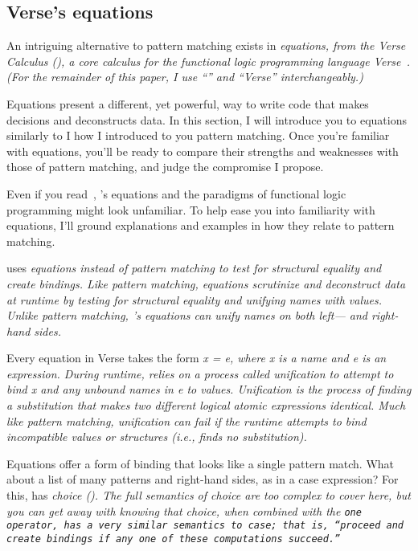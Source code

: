 \documentclass[manuscript,screen,review, 12pt, nonacm]{acmart}
\begin{document}
    
    \subsection{Verse's equations}
    \label{verseoverobservers}

    An intriguing alternative to pattern matching exists in \it{equations}, from
    the Verse Calculus (\VC), a core calculus for the functional logic
    programming language \it{Verse}~\citep{antoy2010functional,
    hanus2013functional, verse}. (For the remainder of this paper, I use “\VC”
    and “Verse” interchangeably.)

    Equations present a different, yet powerful, way to write code that makes
    decisions and deconstructs data. In this section, I will introduce you to
    equations similarly to I how I introduced to you pattern matching. Once
    you're familiar with equations, you'll be ready to compare their strengths
    and weaknesses with those of pattern matching, and judge the compromise I
    propose. 

    Even if you read~\citet{verse}, \VC's equations and the paradigms of
    functional logic programming might look unfamiliar. To help ease you into
    familiarity with equations, I'll ground explanations and examples in how
    they relate to pattern matching. 

    \VC uses \it{equations} instead of pattern matching to test for structural
    equality and create bindings. Like pattern matching, equations scrutinize
    and deconstruct data at runtime by testing for structural equality and
    unifying names with values. Unlike pattern matching, \VC's equations can
    unify names on both left--- \it{and} right-hand sides. 

    Every equation in Verse takes the form \it{x = e}, where \it{x} is a name
    and \it{e} is an expression. During runtime, \VC relies on a process called
    \it{unification} to attempt to bind \it{x} and any unbound names in \it{e}
    to values. Unification is the process of finding a substitution that makes
    two different logical atomic expressions identical. Much like pattern
    matching, unification can fail if the runtime attempts to bind incompatible
    values or structures (i.e., finds no substitution). 

    Equations offer a form of binding that looks like a single pattern match.
    What about a list of many patterns and right-hand sides, as in a case
    expression? For this, \VC has \it{choice} (\choice). The full semantics of
    choice are too complex to cover here, but you can get away with knowing that
    choice, when combined with the \tt{one} operator, has a very similar
    semantics to case; that is, “proceed and create bindings if any one of these
    computations succeed.” 
\end{document}
